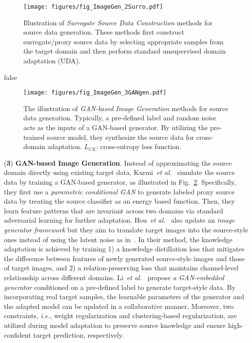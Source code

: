 \documentclass[10pt,journal,compsoc]{IEEEtran}
\def\etal{{\em et al.}}
\def\ie{{\em i.e.}}
\begin{document}
\begin{figure}[!t]
\setlength{\abovecaptionskip}{0pt}
\setlength{\belowcaptionskip}{-2pt}
\setlength{\abovedisplayskip}{-2pt}
\setlength{\belowdisplayskip}{-2pt}
	\centering
	\texttt{[image: figures/fig\_ImageGen\_2Surro.pdf]}
	\caption{Illustration of \emph{Surrogate Source Data Construction} methods for source data generation.
	These methods first construct surrogate/proxy source data by selecting appropriate samples from the target domain and then perform standard unsupervised domain adaptation (UDA).}
	\label{fig_ImageGen_2Surro}
\end{figure}

\if false
\begin{figure}[!t]
\setlength{\abovecaptionskip}{0pt}
\setlength{\belowcaptionskip}{-2pt}
\setlength{\abovedisplayskip}{-2pt}
\setlength{\belowdisplayskip}{-2pt}
	\centering
	\texttt{[image: figures/fig\_ImageGen\_3GANgen.pdf]}
	\caption{
	The illustration of \emph{GAN-based Image Generation} methods for source data generation.
	Typically, a pre-defined label and random noise acts as the inputs of a GAN-based generator.
	By utilizing the pre-trained source model, they synthesize the source data for cross-domain adaptation.
	$L_{CE}$: cross-entropy loss function.}
	\label{fig_ImageGen_3GANgen}
\end{figure}
\fi

(\textbf{3}) \textbf{GAN-based Image Generation}. %
Instead of approximating the source domain directly using existing target data, Kurmi~\etal~\cite{kurmi2021domain} simulate the source data by training a GAN-based generator, as illustrated in Fig.~\ref{fig_ImageGen_3GANgen}.
Specifically, they first use a \emph{parametric conditional GAN} to generate labeled proxy source data by treating the source classifier as an energy based function.
Then, they learn feature patterns that are invariant across two domains via standard adversarial learning for further adaptation.
Hou~\etal~\cite{hou2021visualizing} also update an \emph{image generator framework} but they aim to translate target images into the source-style ones instead of using the latent noise as in~\cite{kurmi2021domain}.
In their method, the knowledge adaptation is achieved by training 1) a knowledge distillation loss that mitigates the difference between features of newly generated source-style images and those of target images, and 2) a relation-preserving loss that maintains channel-level relationship across different domains. 
Li~\etal~\cite{li2020model} propose \emph{a GAN-embedded generator} conditioned on a pre-defined label to generate target-style data.
By incorporating real target samples, the learnable parameters of the generator and the adapted model can be updated in a collaborative manner.
Moreover, two constraints, \ie, weight regularization and clustering-based regularization, are utilized during model adaptation to preserve source knowledge and ensure high-confident target prediction, respectively.
\end{document}

